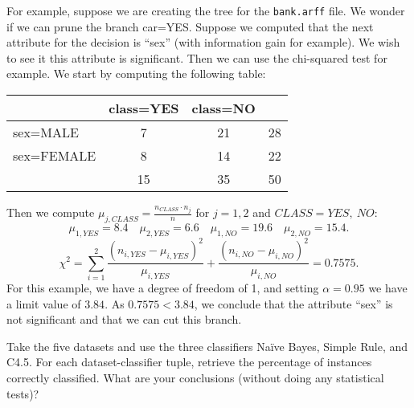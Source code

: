 \documentclass[fontsize=12pt, usenames, dvipsnames, headinclude, headsepline, footinclude, footsepline]{scrartcl}
\begin{document}
\begin{sol}
\begin{description}
        For example, suppose we are creating the tree for the \texttt{bank.arff} file. We wonder if we can prune the branch
        car=YES. Suppose we computed that the next attribute for the decision is ``sex'' (with information
        gain for example). We wish to see it this attribute is significant. Then we can use the chi-squared
        test for example. We start by computing the following table:
        \begin{center}
          \begin{tabular}{l|c|c|c}
            & class=YES & class=NO & \multicolumn{1}{l}{} \\ \hline
            sex=MALE   & 7         & 21       & 28                   \\ \hline
            sex=FEMALE & 8         & 14       & 22                   \\ \hline
            & 15        & 35       & 50                  
          \end{tabular}
        \end{center}
        Then we compute $\mu_{j, CLASS} = \frac{n_{CLASS} \cdot n_j}{n}$ for $j = 1, 2$ and $CLASS=YES,\ NO$:
        \[ \mu_{1, YES} = 8.4 \quad \mu_{2, YES} = 6.6 \quad \mu_{1, NO} = 19.6 \quad \mu_{2, NO} = 15.4. \] 
        \[ \chi^2 = \sum_{i=1}^2 \frac{(n_{i, YES} - \mu_{i, YES})^2}{\mu_{i, YES}} + \frac{(n_{i, NO} -
            \mu_{i, NO})^2}{\mu_{i, NO}} = 0.7575. \]
        For this example, we have a degree of freedom of 1, and setting $\alpha = 0.95$ we have a limit value
        of $3.84$. As $0.7575 < 3.84$, we conclude that the attribute ``sex'' is not significant and that we
        can cut this branch. \qedhere
    \end{description}
  \end{sol}



\begin{exo}
  Take the five datasets and use the three classifiers Naïve Bayes, Simple Rule, and C4.5. For each
  dataset-classifier tuple, retrieve the percentage of instances correctly classified. What are your
  conclusions (without doing any statistical tests)?
\end{exo}
  
\end{document}
